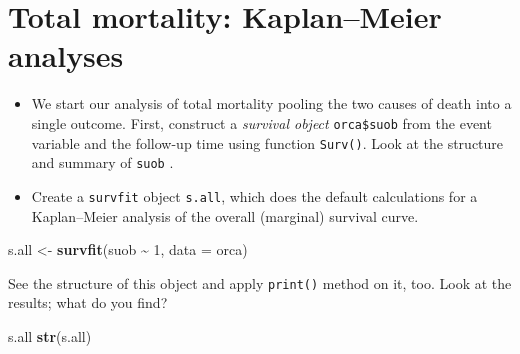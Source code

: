 \documentclass[
]{book}
\newenvironment{Shaded}{\begin{snugshade}}{\end{snugshade}}
\newcommand{\AttributeTok}[1]{\textcolor[rgb]{0.13,0.29,0.53}{#1}}
\newcommand{\DecValTok}[1]{\textcolor[rgb]{0.00,0.00,0.81}{#1}}
\newcommand{\FunctionTok}[1]{\textcolor[rgb]{0.13,0.29,0.53}{\textbf{#1}}}
\newcommand{\NormalTok}[1]{#1}
\newcommand{\OtherTok}[1]{\textcolor[rgb]{0.56,0.35,0.01}{#1}}
\newcommand{\SpecialCharTok}[1]{\textcolor[rgb]{0.81,0.36,0.00}{\textbf{#1}}}
\providecommand{\tightlist}{%
  \setlength{\itemsep}{0pt}\setlength{\parskip}{0pt}}
\begin{document}
\section{Total mortality: Kaplan--Meier analyses}\label{total-mortality-kaplanmeier-analyses}

\begin{itemize}
\tightlist
\item
  We start our analysis of total mortality pooling the two causes of death into
  a single outcome.
  First, construct a \emph{survival object} \texttt{orca\$suob} from
  the event variable and the follow-up time using function \texttt{Surv()}.
  Look at the structure and summary of \texttt{suob} .
\end{itemize}

\begin{Shaded}
\end{Shaded}

\begin{itemize}
\tightlist
\item
  Create a \texttt{survfit} object \texttt{s.all}, which does the
  default calculations for a Kaplan--Meier
  analysis of the overall (marginal) survival curve.
\end{itemize}

\begin{Shaded}
\begin{Highlighting}[]
\NormalTok{s.all }\OtherTok{\textless{}{-}} \FunctionTok{survfit}\NormalTok{(suob }\SpecialCharTok{\textasciitilde{}} \DecValTok{1}\NormalTok{, }\AttributeTok{data =}\NormalTok{ orca)}
\end{Highlighting}
\end{Shaded}

See the structure of this object and apply \texttt{print()} method on it, too.
Look at the results; what do you find?

\begin{Shaded}
\begin{Highlighting}[]
\NormalTok{s.all}
\FunctionTok{str}\NormalTok{(s.all)}
\end{Highlighting}
\end{Shaded}
\end{document}
